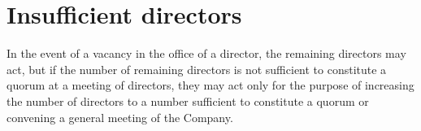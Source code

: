 \section{Insufficient directors}

In the event of a vacancy in the office of a director, the remaining directors may act, but if the number of remaining directors is not sufficient to constitute a quorum at a meeting of directors, they may act only for the purpose of increasing the number of directors to a number sufficient to constitute a quorum or convening a general meeting of the Company. 